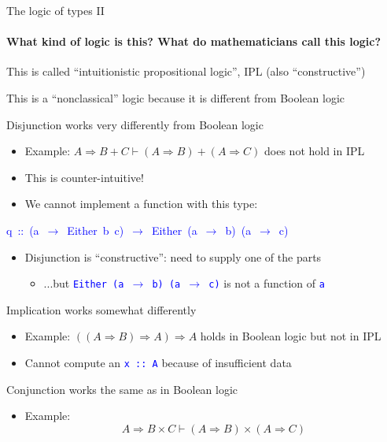 \documentclass[english]{beamer}
\newenvironment{lyxcode}
   {\par\begin{list}{}{
     \setlength{\rightmargin}{\leftmargin}
     \setlength{\listparindent}{0pt}%
     \raggedright
     \setlength{\itemsep}{0pt}
     \setlength{\parsep}{0pt}
     \normalfont\ttfamily}%
    \def\{{\char`\{}
    \def\}{\char`\}}
    \def\textasciitilde{\char`\~}
    \item[]}
   {\end{list}}
\begin{document}
\begin{frame}{The logic of types II}


\framesubtitle{What kind of logic is this? What do mathematicians call this logic?}

This is called ``intuitionistic propositional logic'', IPL (also
``constructive'')
\begin{itemize}
\item This is a ``nonclassical'' logic because it is different from Boolean
logic
\item Disjunction works very differently from Boolean logic
\begin{itemize}
\item Example: $A\Rightarrow B+C\vdash(A\Rightarrow B)+(A\Rightarrow C)$
does not hold in IPL
\item This is counter-intuitive!
\item We cannot implement a function with this type:
\end{itemize}
\begin{lyxcode}
\textcolor{blue}{\footnotesize{}q~::~(a~$\rightarrow$~Either~b~c)~$\rightarrow$~Either~(a~$\rightarrow$~b)~(a~$\rightarrow$~c)}{\footnotesize \par}
\end{lyxcode}
\begin{itemize}
\item Disjunction is ``constructive'': need to supply one of the parts
\begin{itemize}
\item ...but \texttt{\textcolor{blue}{\footnotesize{}Either (a $\rightarrow$
b) (a $\rightarrow$ c)}} is not a function of \texttt{\textcolor{blue}{\footnotesize{}a}} 
\end{itemize}
\end{itemize}
\item Implication works somewhat differently
\begin{itemize}
\item Example: $\left(\left(A\Rightarrow B\right)\Rightarrow A\right)\Rightarrow A$
holds in Boolean logic but not in IPL
\item Cannot compute an \texttt{\textcolor{blue}{\footnotesize{}x ::\ A}}
because of insufficient data
\end{itemize}
\item Conjunction works the same as in Boolean logic
\begin{itemize}
\item Example: 
\[
A\Rightarrow B\times C\vdash\left(A\Rightarrow B\right)\times\left(A\Rightarrow C\right)
\]
 
\end{itemize}
\end{itemize}
\end{frame}
\end{document}
